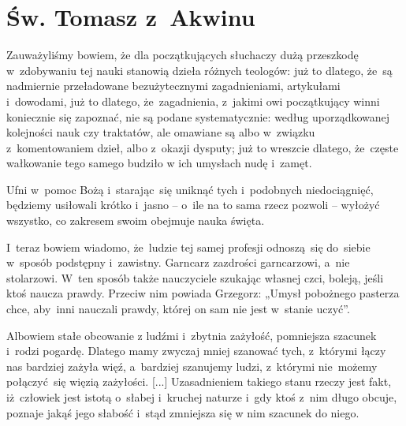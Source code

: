 \documentclass[a4paper,11pt]{article}
\begin{document}










\section{Św. Tomasz z~Akwinu}



Zauważyliśmy bowiem, że dla początkujących słuchaczy dużą przeszkodę
w~zdobywaniu tej nauki stanowią dzieła różnych teologów: już to
dlatego, że~są nadmiernie przeładowane bezużytecznymi zagadnieniami,
artykułami i~dowodami, już to dlatego, że~zagadnienia, z~jakimi owi
początkujący winni koniecznie się zapoznać, nie są podane
systematycznie: według uporządkowanej kolejności nauk czy traktatów,
ale omawiane są albo w~związku z~komentowaniem dzieł, albo z~okazji
dysputy; już to wreszcie dlatego, że~częste wałkowanie tego samego
budziło w ich umysłach nudę i~zamęt.

Ufni w~pomoc Bożą i~starając~się uniknąć tych i~podobnych
niedociągnięć, będziemy usiłowali krótko i~jasno -- o~ile na to sama
rzecz pozwoli -- wyłożyć wszystko, co zakresem swoim obejmuje nauka
święta.


\vspace{\spaceThree}



\noindent
I~teraz bowiem wiadomo, że~ludzie tej samej profesji odnoszą~się
do~siebie w~sposób podstępny i~zawistny. Garncarz zazdrości
garncarzowi, a~nie stolarzowi. W~ten sposób także nauczyciele szukając
własnej czci, boleją, jeśli ktoś naucza prawdy. Przeciw nim powiada
Grzegorz: „Umysł pobożnego pasterza chce, aby~inni nauczali prawdy,
której on sam nie jest w~stanie uczyć”.


\vspace{\spaceThree}



\noindent
Albowiem stałe obcowanie z ludźmi i~zbytnia zażyłość, pomniejsza
szacunek i~rodzi pogardę. Dlatego mamy zwyczaj mniej szanować tych,
z~którymi łączy nas bardziej zażyła więź, a~bardziej szanujemy ludzi,
z~którymi nie~możemy połączyć~się więzią zażyłości. [...]
Uzasadnieniem takiego stanu rzeczy jest fakt, iż~człowiek jest istotą
o~słabej i~kruchej naturze i~gdy ktoś z~nim długo obcuje, poznaje
jakąś jego słabość i~stąd zmniejsza się w nim szacunek do niego.
\end{document}
